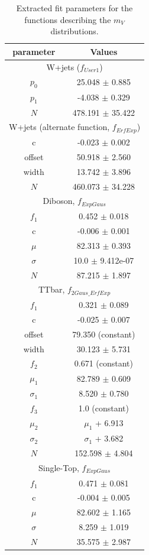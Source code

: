 \begin{table}[!htbp]
	\centering
	\begin{tabular}{||c | c||} 
	 \hline
	  parameter & Values \\
	 \hline \hline
	 \multicolumn{2}{|c|}{W+jets ($f_{User1}$)}\\
	 \hline
	 $p_0$		&	25.048 $\pm$ 0.885\\
	 $p_1$		&	-4.038 $\pm$ 0.329\\
	 $N$		&	478.191 $\pm$ 35.422\\
	 \hline \hline
	 \multicolumn{2}{|c|}{W+jets (alternate function, $f_{ErfExp}$)}\\
	 \hline
	 c 			&	-0.023 $\pm$ 0.002\\
	 offset 	&	50.918 $\pm$ 2.560\\
	 width 		&	13.742 $\pm$ 3.896\\
	 $N$		&	460.073 $\pm$ 34.228\\
	 \hline \hline
	 \multicolumn{2}{|c|}{Diboson, $f_{ExpGaus}$}\\
	 \hline 
	 $f_1$		&	0.452 $\pm$ 0.018\\
	 c 			&	-0.006 $\pm$ 0.001 \\
	 $\mu$		&	82.313 $\pm$ 0.393\\
	 $\sigma$	&	10.0 $\pm$ 9.412e-07\\
	 $N$		&	87.215 $\pm$ 1.897\\
	 \hline \hline
	 \multicolumn{2}{|c|}{TTbar, $f_{2Gaus\_ErfExp}$}\\
	 \hline 
	 $f_1$		&	0.321 $\pm$ 0.089\\
	 c 			&	-0.025 $\pm$ 0.007\\
	 offset 	&	79.350 (constant)\\
	 width 		&	30.123 $\pm$ 5.731\\
	 $f_2$		&	0.671 (constant)\\
	 $\mu_1$	&	82.789 $\pm$ 0.609\\
	 $\sigma_1$	&	8.520 $\pm$ 0.780\\
	 $f_3$		&	1.0 (constant)\\
	 $\mu_2$	&	$\mu_1$ + 6.913 \\
	 $\sigma_2$	&	$\sigma_1$ + 3.682\\
	 $N$		&	152.598 $\pm$ 4.804\\
	 \hline \hline
	 \multicolumn{2}{|c|}{Single-Top, $f_{ExpGaus}$}\\
	 \hline 
	 $f_1$		&	0.471 $\pm$ 0.081\\
	 c 			&	-0.004 $\pm$ 0.005 \\
	 $\mu$		&	82.602 $\pm$ 1.165\\
	 $\sigma$	&	8.259 $\pm$ 1.019\\
	 $N$		&	35.575 $\pm$ 2.987\\
	 \hline 
	\end{tabular}
 	\caption{Extracted fit parameters for the functions describing the $m_{V}$ distributions.}
 	\label{Table:BackgroundEst_fitPars}
\end{table}
